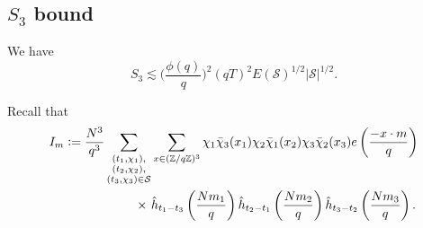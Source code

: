 \subsection{$S_3$ bound}
\begin{proposition}\label{s_3bound}
    We have \[
    S_3 \lesssim \Big(\frac{\phi(q)}{q}\Big)^2 (qT)^2 E(\mathcal{S})^{1/2} |\mathcal{S}|^{1/2}.
    \]
\end{proposition}
Recall that \begin{align*}
	I_m\defeq\frac{N^3}{q^3}\sum_{\substack{(t_1,\chi_1),\\(t_2,\chi_2),\\(t_3,\chi_3)\in\mathcal{S}}} &\sum_{x\in (\mathbb{Z}/q\mathbb{Z})^3}\chi_1\bar{\chi}_3(x_1)\chi_2\bar{\chi}_1(x_2)\chi_3\bar{\chi}_2(x_3) e\left(\frac{-x\cdot m}{q}\right)\\
	\times \ &\hat{h}_{t_1-t_3}\left(\frac{Nm_1}{q}\right)\hat{h}_{t_2-t_1}\left(\frac{Nm_2}{q}\right)\hat{h}_{t_3-t_2}\left(\frac{Nm_3}{q}\right).
\end{align*}

